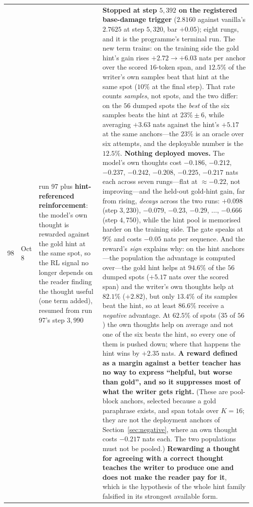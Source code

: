 \documentclass{article} %
\begin{document}
{\begin{longtable}{@{}llp{3.6cm}p{5.6cm}@{}}
\midrule
98 & Oct 8 & run 97 plus \textbf{hint-referenced reinforcement}: the model's own thought is rewarded against the gold hint at the same spot, so the RL signal no longer depends on the reader finding the thought useful (one term added), resumed from run 97's step $3{,}990$ & \textbf{Stopped at step $5{,}392$ on the registered base-damage trigger} ($2.8160$ against vanilla's $2.7625$ at step $5{,}320$, bar $+0.05$); eight rungs, and it is the programme's terminal run. The new term trains: on the training side the gold hint's gain rises $+2.72 \to +6.03$ nats per anchor over the scored $16$-token span, and $12.5\%$ of the writer's own samples beat that hint at the same spot ($10\%$ at the final step). That rate counts \emph{samples}, not spots, and the two differ: on the $56$ dumped spots the \emph{best} of the six samples beats the hint at $23\% \pm 6$, while averaging $+3.63$ nats against the hint's $+5.17$ at the same anchors---the $23\%$ is an oracle over six attempts, and the deployable number is the $12.5\%$. \textbf{Nothing deployed moves.} The model's own thoughts cost $-0.186$, $-0.212$, $-0.237$, $-0.242$, $-0.208$, $-0.225$, $-0.217$ nats each across seven rungs---flat at ${\approx}{-}0.22$, not improving---and the held-out gold-hint gain, far from rising, \emph{decays} across the two runs: $+0.098$ (step $3{,}230$), $-0.079$, $-0.23$, $-0.29$, $\ldots$, $-0.666$ (step $4{,}750$), while the hint pool is memorised harder on the training side. The gate speaks at $9\%$ and costs $-0.05$ nats per sequence. And the reward's \emph{sign} explains why: on the hint anchors---the population the advantage is computed over---the gold hint helps at $94.6\%$ of the $56$ dumped spots ($+5.17$ nats over the scored span) and the writer's own thoughts help at $82.1\%$ ($+2.82$), but only $13.4\%$ of its samples beat the hint, so at least $86.6\%$ receive a \emph{negative} advantage. At $62.5\%$ of spots ($35$ of $56$) the own thoughts help on average and not one of the six beats the hint, so every one of them is pushed down; where that happens the hint wins by $+2.35$ nats. \textbf{A reward defined as a margin against a better teacher has no way to express ``helpful, but worse than gold'', and so it suppresses most of what the writer gets right.} (These are pool-block anchors, selected because a gold paraphrase exists, and span totals over $K{=}16$; they are not the deployment anchors of Section~\ref{sec:negative}, where an own thought costs $-0.217$ nats each. The two populations must not be pooled.) \textbf{Rewarding a thought for agreeing with a correct thought teaches the writer to produce one and does not make the reader pay for it}, which is the hypothesis of the whole hint family falsified in its strongest available form. \\
\end{longtable}
}
\end{document}
